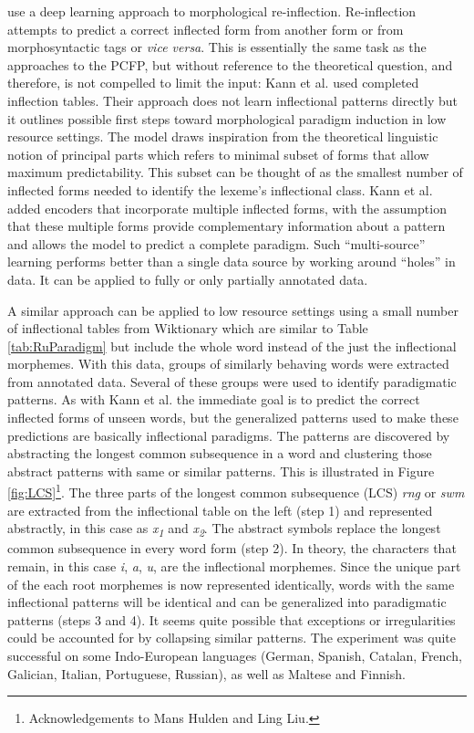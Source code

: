 \documentclass[12pt]{article}
\begin{document}
 use a deep learning approach to morphological re-inflection. Re-inflection attempts to predict a correct inflected form from another form or from morphosyntactic tags or \textit{vice versa}. This is essentially the same task as the approaches to the PCFP, but without reference to the theoretical question, and therefore, is not compelled to limit the input: Kann et al. used completed inflection tables. Their approach does not learn inflectional patterns directly but it outlines possible first steps toward morphological paradigm induction in low resource settings. The model draws inspiration from the theoretical linguistic notion of principal parts \cite{finkel_principal_2007} which refers to minimal subset of forms that allow maximum predictability. This subset can be thought of as the smallest number of inflected forms needed to identify the lexeme's inflectional class. Kann et al. added encoders that incorporate multiple inflected forms, with the assumption that these multiple forms provide complementary information about a pattern and allows the model to predict a complete paradigm. Such ``multi-source'' learning performs better than a single data source by working around ``holes” in data. It can be applied to fully or only partially annotated data.

A similar approach can be applied to low resource settings \cite{ahlberg_semi-supervised_2014,ahlberg_paradigm_2015} using a small number of inflectional tables from Wiktionary which are similar to Table \ref{tab:RuParadigm} but include the whole word instead of the just the inflectional morphemes. With this data, groups of similarly behaving words were extracted from annotated data. Several of these groups were used to identify paradigmatic patterns.  As with Kann et al. the immediate goal is to predict the correct inflected forms of unseen words, but the generalized patterns used to make these predictions are basically inflectional paradigms. The patterns are discovered by abstracting the longest common subsequence in a word and clustering those abstract patterns with same or similar patterns. This is illustrated in Figure \ref{fig:LCS}\footnote{Acknowledgements to Mans Hulden and Ling Liu.}. The three parts of the longest common subsequence (LCS) \textit{rng} or \textit{swm} are extracted from the inflectional table on the left (step 1) and represented abstractly, in this case as \textit{x\textsubscript{1}} and \textit{x\textsubscript{2}}. The abstract symbols replace the longest common subsequence in every word form (step 2). In theory, the characters that remain, in this case \textit{i}, \textit{a}, \textit{u}, are the inflectional morphemes. Since the unique part of the each root morphemes is now represented identically, words with the same inflectional patterns will be identical and can be generalized into paradigmatic patterns (steps 3 and 4). It seems quite possible that exceptions or irregularities could be accounted for by collapsing similar patterns. The experiment was quite successful on some Indo-European languages (German, Spanish, Catalan, French, Galician, Italian, Portuguese, Russian), as well as Maltese and Finnish.
\end{document}
